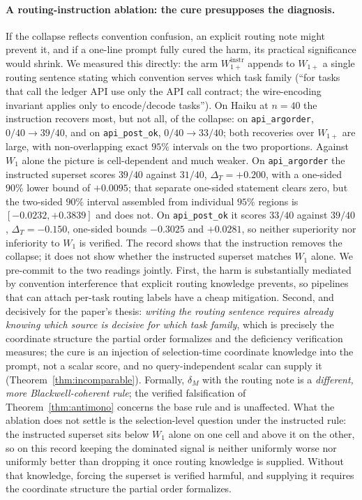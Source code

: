 \documentclass[11pt]{article}
\theoremstyle{plain}
\theoremstyle{definition}
\theoremstyle{remark}
\begin{document}
\paragraph{A routing-instruction ablation: the cure presupposes the diagnosis.}
If the collapse reflects convention confusion, an explicit routing note might prevent it, and if a
one-line prompt fully cured the harm, its practical significance would shrink. We measured this
directly: the arm $W_{1+}^{\mathrm{instr}}$ appends to $W_{1+}$ a single routing sentence stating
which convention serves which task family (``for tasks that call the ledger API use only the API
call contract; the wire-encoding invariant applies only to encode/decode tasks''). On Haiku at
$n=40$ the instruction recovers most, but not all, of the collapse: on
\texttt{api\_argorder}, $0/40 \to 39/40$, and on \texttt{api\_post\_ok}, $0/40 \to 33/40$; both
recoveries over $W_{1+}$ are large, with non-overlapping exact $95\%$ intervals on the two
proportions. Against $W_1$ alone the picture is cell-dependent and much weaker. On
\texttt{api\_argorder} the instructed superset scores $39/40$ against $31/40$,
$\Delta_T=+0.200$, with a one-sided $90\%$ lower bound of $+0.0095$; that separate one-sided
statement clears zero, but the two-sided $90\%$ interval assembled from individual $95\%$ regions
is $[-0.0232,+0.3839]$ and does not. On \texttt{api\_post\_ok} it scores $33/40$ against $39/40$,
$\Delta_T=-0.150$, one-sided bounds $-0.3025$ and $+0.0281$, so neither superiority nor
inferiority to $W_1$ is verified. The record shows that the instruction removes the collapse; it
does not show whether the instructed superset matches $W_1$ alone. We pre-commit to the two readings jointly. First, the harm is substantially mediated by
convention interference that explicit routing knowledge prevents, so pipelines that can attach
per-task routing labels have a cheap mitigation. Second, and decisively for the paper's thesis:
\emph{writing the routing sentence requires already knowing which source is decisive for which
task family}, which is precisely the coordinate structure the partial order formalizes and
the deficiency verification measures; the cure is an injection of selection-time coordinate knowledge
into the prompt, not a scalar score, and no query-independent scalar can supply it
(Theorem~\ref{thm:incomparable}). Formally, $\delta_M$ with the routing note is a
\emph{different, more Blackwell-coherent rule}; the verified falsification of
Theorem~\ref{thm:antimono} concerns the base rule and is unaffected. What the ablation does not
settle is the selection-level question under the instructed rule: the instructed superset sits
below $W_1$ alone on one cell and above it on the other, so on this record keeping the dominated
signal is neither uniformly worse nor uniformly better than dropping it once routing knowledge is
supplied. Without that knowledge, forcing the superset is verified harmful, and supplying it
requires the coordinate structure the partial order formalizes.
\end{document}

